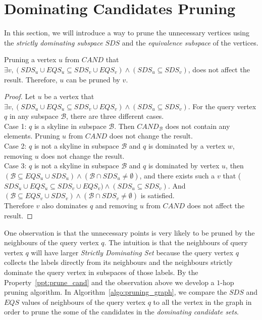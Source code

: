 \section{Dominating Candidates Pruning}

In this section, we will introduce a way to prune the unnecessary vertices using the \emph{strictly dominating subspace} $SDS$ and the \emph{equivalence subspace} of the vertices.

\begin{property}
\label{ppt:prune_cand}
Pruning a vertex $u$ from $\mathit{CAND}$ that $\exists v, (SDS_u \cup EQS_u \subseteq SDS_v \cup EQS_v) \wedge (SDS_u \subseteq SDS_v)$, does not affect the result. Therefore, $u$ can be pruned by $v$.
\end{property}

\begin{proof}
Let $u$ be a vertex that $\exists v, (SDS_u \cup EQS_u \subseteq SDS_v \cup EQS_v) \wedge (SDS_u \subseteq SDS_v)$. For the query vertex $q$ in any subspace $\mathcal{B}$, there are three different cases.\\
Case 1: $q$ is a skyline in subspace $\mathcal{B}$. Then $\mathit{CAND}_\mathcal{B}$ does not contain any elements. Pruning $u$ from $\mathit{CAND}$ does not change the result.\\
Case 2: $q$ is not a skyline in subspace $\mathcal{B}$ and $q$ is dominated by a vertex $w$, removing $u$ does not change the result.\\
Case 3: $q$ is not a skyline in subspace $\mathcal{B}$ and $q$ is dominated by vertex $u$, then $(\mathcal{B} \subseteq EQS_u \cup SDS_u) \wedge (\mathcal{B} \cap SDS_u \not= \emptyset)$, and there exists such a $v$ that ($SDS_u \cup EQS_u \subseteq SDS_v \cup EQS_v) \wedge (SDS_u \subseteq SDS_v)$. And $(\mathcal{B} \subseteq EQS_v \cup SDS_v) \wedge (\mathcal{B} \cap SDS_v \not= \emptyset)$ is satisfied.\\
Therefore $v$ also dominates $q$ and removing $u$ from $CAND$ does not affect the result.
\end{proof}

One observation is that the unnecessary points is very likely to be pruned by the neighbours of the query vertex $q$. The intuition is that the neighbours of query vertex $q$ will have larger \emph{Strictly Dominating Set} because the query vertex $q$ collects the labels directly from its neighbours and the neighbours strictly dominate the query vertex in subspaces of those labels.
By the Property~\ref{ppt:prune_cand} and the observation above we develop a $1$-hop pruning algorithm. In Algorithm~\ref{algo:pruning_graph}, we compare the $\mathit{SDS}$ and $\mathit{EQS}$ values of neighbours of the query vertex $q$ to all the vertex in the graph in order to prune the some of the candidates in the \emph{dominating candidate sets}.

